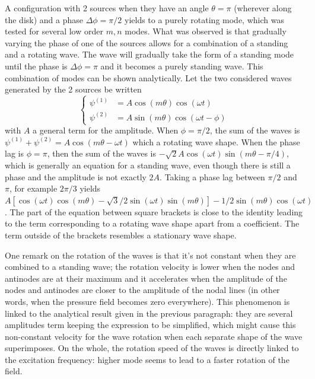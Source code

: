 \documentclass[%
 reprint,
 amsmath,amssymb,
 aps,
]{revtex4-2}
\begin{document}
A configuration with 2 sources when they have an angle $\theta = \pi$ (wherever along the disk) and a phase $\Delta \phi = \pi/2$ yields to a purely rotating mode, which was tested for several low order $m,n$ modes. What was observed is that gradually varying the phase of one of the sources allows for a combination of a standing and a rotating wave. The wave will gradually take the form of a standing mode until the phase is $\Delta \phi = \pi$ and it becomes a purely standing wave. This combination of modes can be shown analytically. Let the two considered waves generated by the 2 sources be written
\begin{equation}
   \begin{cases}
       \psi^{(1)} &= A\cos(m\theta)\cos(\omega t) \\
       \psi^{(2)} &= A\sin(m\theta)\cos(\omega t - \phi)
   \end{cases} 
\end{equation}
with $A$ a general term for the amplitude. When $\phi = \pi/2$, the sum of the waves is $\psi^{(1)} + \psi^{(2)} = A \cos(m\theta - \omega t)$ which a rotating wave shape. When the phase lag is $\phi = \pi$, then the sum of the waves is $-\sqrt{2}A\cos(\omega t)\sin(m\theta-\pi/4)$, which is generally an equation for a standing wave, even though there is still a phase and the amplitude is not exactly $2A$. Taking a phase lag between $\pi/2$ and $\pi$, for example $2\pi/3$ yields $A \left[\cos(\omega t) \cos(m\theta) - \sqrt{3}/2 \sin(\omega t) \sin(m \theta) \right] - 1/2 \sin(m \theta)\cos(\omega t)$. The part of the equation between square brackets is close to the identity leading to the term corresponding to a rotating wave shape apart from a coefficient. The term outside of the brackets resembles a stationary wave shape.

One remark on the rotation of the waves is that it's not constant when they are combined to a standing wave; the rotation velocity is lower when the nodes and antinodes are at their maximum and it accelerates when the amplitude of the nodes and antinodes are closer to the amplitude of the nodal lines (in other words, when the pressure field becomes zero everywhere). This phenomenon is linked to the analytical result given in the previous paragraph: they are several amplitudes term keeping the expression to be simplified, which might cause this non-constant velocity for the wave rotation when each separate shape of the wave superimposes. On the whole, the rotation speed of the waves is directly linked to the excitation frequency: higher mode seems to lead to a faster rotation of the field. 
\end{document}
